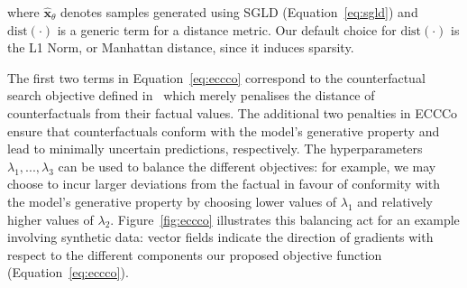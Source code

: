 \documentclass{article}
\begin{document}
where $\hat{\mathbf{x}}_{\theta}$ denotes samples generated using SGLD (Equation~\ref{eq:sgld}) and $\text{dist}(\cdot)$ is a generic term for a distance metric. Our default choice for $\text{dist}(\cdot)$ is the L1 Norm, or Manhattan distance, since it induces sparsity.

The first two terms in Equation~\ref{eq:eccco} correspond to the counterfactual search objective defined in~\citet{wachter2017counterfactual} which merely penalises the distance of counterfactuals from their factual values. The additional two penalties in ECCCo ensure that counterfactuals conform with the model's generative property and lead to minimally uncertain predictions, respectively. The hyperparameters $\lambda_1, ..., \lambda_3$ can be used to balance the different objectives: for example, we may choose to incur larger deviations from the factual in favour of conformity with the model's generative property by choosing lower values of $\lambda_1$ and relatively higher values of $\lambda_2$. Figure~\ref{fig:eccco} illustrates this balancing act for an example involving synthetic data: vector fields indicate the direction of gradients with respect to the different components our proposed objective function (Equation~\ref{eq:eccco}).

\medskip

\renewcommand{\algorithmicrequire}{\textbf{Input:}}
\renewcommand{\algorithmicensure}{\textbf{Output:}}
  
\end{document}
